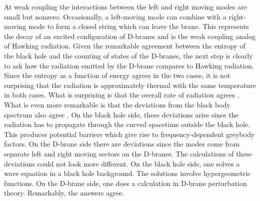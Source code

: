 At weak coupling the interactions between the left and right moving
modes  are small but nonzero. Occasionally, a left-moving mode
can combine with a right-moving mode to form a closed string which
can leave the brane. This represents the decay of an excited configuration
of D-branes and is the weak coupling analog of Hawking radiation.
Given the remarkable agreement between the entropy of the black hole
and the counting of states of the D-branes, the next step is clearly 
to ask how the radiation emitted by the D-brane compares to Hawking
radiation.  
Since the entropy as a function of energy
agrees in the two cases, it is not surprising that the radiation is
approximately thermal with the same temperature in both cases. What
is surprising is that the overall rate of radiation agrees \cite{dama}.
What is even more remarkable is that the deviations from the
black body spectrum also agree \cite{mast2}. 
On the black hole side, these deviations
arise since the radiation has to propagate through the curved spacetime
outside the black hole. This produces potential barriers which give
rise to frequency-dependent greybody factors. On the D-brane side
there are deviations since the modes come from separate 
left and right moving
sectors on the  D-branes. The calculations of these deviations
could not look more
different.
On the black hole side, one solves a wave equation in a black hole 
background. The solutions involve hypergeometric functions. On the
D-brane side, one does a calculation in D-brane perturbation theory.
Remarkably, the answers agree.

